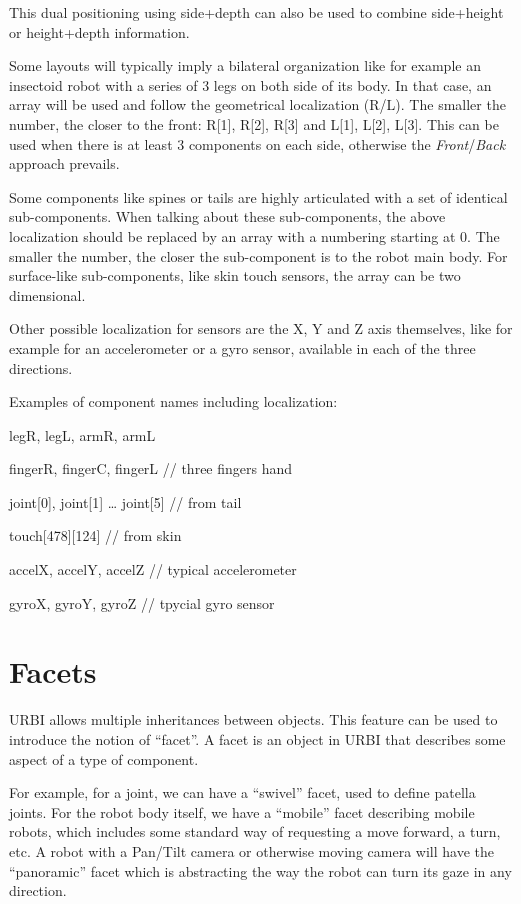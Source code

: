 \documentclass[a4paper]{article}
\begin{document}
This dual positioning using side+depth can also be used to combine
side+height or height+depth information.


Some layouts will typically imply a bilateral organization like for
example an insectoid robot with a series of 3 legs on both side of its
body. In that case, an array will be used and follow the geometrical
localization (R/L). The smaller the number, the closer to the front:
R[1], R[2], R[3] and L[1], L[2], L[3]. This can be used when there is
at least 3 components on each side, otherwise the
\textit{Front}/\textit{Back} approach prevails.


Some components like spines or tails are highly articulated with a set
of identical sub-components. When talking about these sub-components,
the above localization should be replaced by an array with a numbering
starting at 0. The smaller the number, the closer the sub-component is
to the robot main body. For surface-like sub-components, like skin
touch sensors, the array can be two dimensional.


Other possible localization for sensors are the X, Y and Z axis
themselves, like for example for an accelerometer or a gyro sensor,
available in each of the three directions.


Examples of component names including localization:

{
legR, legL, armR, armL}

{
fingerR, fingerC, fingerL // three fingers hand}

{
joint[0], joint[1] … joint[5] // from tail}

{
touch[478][124] // from skin}

{
accelX, accelY, accelZ // typical accelerometer}

{
gyroX, gyroY, gyroZ // tpycial gyro sensor}

\section{Facets}

URBI allows multiple inheritances between objects. This feature can be
used to introduce the notion of “facet”. A facet is an object in URBI
that describes some aspect of a type of component.


For example, for a joint, we can have a “swivel” facet, used to define
patella joints. For the robot body itself, we have a “mobile” facet
describing mobile robots, which includes some standard way of
requesting a move forward, a turn, etc. A robot with a Pan/Tilt camera
or otherwise moving camera will have the “panoramic” facet which is
abstracting the way the robot can turn its gaze in any direction.
\end{document}
